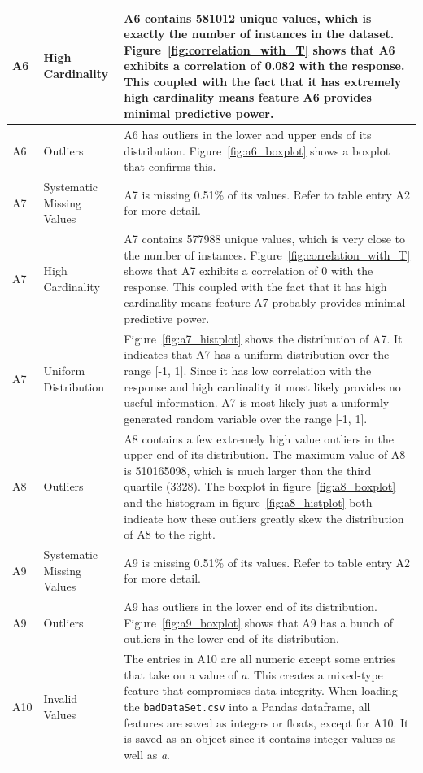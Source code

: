 \documentclass[11pt]{report}
\begin{document}
\begin{longtable}{lp{5cm}p{8cm}}
\midrule
A6 & High Cardinality & A6 contains 581012 unique values, which is exactly the number of instances in the dataset. Figure~\ref{fig:correlation_with_T} shows that A6 exhibits a correlation of 0.082 with the response. This coupled with the fact that it has extremely high cardinality means feature A6 provides minimal predictive power. \\
\midrule
A6 & Outliers & A6 has outliers in the lower and upper ends of its distribution. Figure~\ref{fig:a6_boxplot} shows a boxplot that confirms this. \\
\midrule
A7 & Systematic Missing Values & A7 is missing 0.51\% of its values.  Refer to table entry A2 for more detail. \\
\midrule
A7 & High Cardinality & A7 contains 577988 unique values, which is very close to the number of instances. Figure~\ref{fig:correlation_with_T} shows that A7 exhibits a correlation of 0 with the response. This coupled with the fact that it has high cardinality means feature A7 probably provides minimal predictive power. \\
\midrule
A7 & Uniform Distribution & Figure~\ref{fig:a7_histplot} shows the distribution of A7. It indicates that A7 has a uniform distribution over the range [-1, 1]. Since it has low correlation with the response and high cardinality it most likely provides no useful information. A7 is most likely just a uniformly generated random variable over the range [-1, 1]. \\
\midrule
A8 & Outliers & A8 contains a few extremely high value outliers in the upper end of its distribution. The maximum value of A8 is 510165098, which is much larger than the third quartile (3328). The boxplot in figure~\ref{fig:a8_boxplot} and the histogram in figure~\ref{fig:a8_histplot} both indicate how these outliers greatly skew the distribution of A8 to the right. \\
\midrule
A9 & Systematic Missing Values & A9 is missing 0.51\% of its values.  Refer to table entry A2 for more detail. \\
\midrule
A9 & Outliers & A9 has outliers in the lower end of its distribution. Figure~\ref{fig:a9_boxplot} shows that A9 has a bunch of outliers in the lower end of its distribution. \\
\midrule
A10 & Invalid Values & The entries in A10 are all numeric except some entries that take on a value of \textit{a}. This creates a mixed-type feature that compromises data integrity. When loading the \texttt{badDataSet.csv} into a Pandas dataframe, all features are saved as integers or floats, except for A10. It is saved as an object since it contains integer values as well as \textit{a}. \\

\end{longtable}
\end{document}
